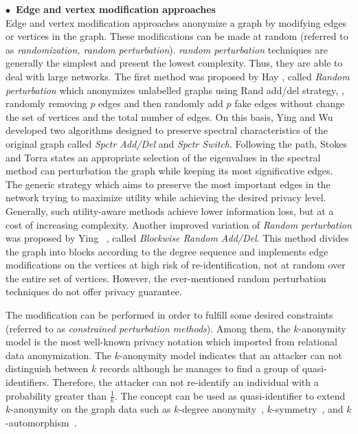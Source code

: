 \hspace{-2em}\textbf{$\bullet$~Edge and vertex modification approaches}\\
Edge and vertex modification approaches anonymize a graph by modifying edges or vertices in the graph. These modifications can be made at random (referred to as {\em randomization, random perturbation}). {\em random perturbation} techniques are generally the simplest and present the lowest complexity. Thus, they are able to deal with large networks. The first method was proposed by Hay {\etal}, called {\em Random perturbation} which anonymizes unlabelled graphs using Rand add/del strategy, {\ie}, randomly removing $p$ edges and then randomly add $p$ fake edges without change the set of vertices and the total number of edges. On this basis, Ying and Wu~\cite{Ying2009,Ying_Randomizing_2008} developed two algorithms designed to preserve spectral characteristics of the original graph called {\em Spctr Add/Del} and {\em Spctr Switch}. Following the path, Stokes and Torra states an appropriate selection of the eigenvalues in the spectral method  can perturbation the graph while keeping its most significative edges. The generic strategy which aims to preserve the most important edges in the network trying to maximize utility while achieving the desired privacy level. Generally, such utility-aware methods achieve lower information loss, but at a cost of increasing complexity. Another improved variation of {\em Random perturbation} was proposed by Ying {\etal}~\cite{Ying2009}, called {\em Blockwise Random Add/Del}. This method divides the graph into blocks according to the degree sequence and implements edge modifications on the vertices at high risk of re-identification, not at random over the entire set of vertices. However, the ever-mentioned random perturbation techniques do not offer privacy guarantee.

The modification can be performed in order to fulfill some desired constraints (referred to as {\em constrained perturbation methods}). Among them, the $k$-anonymity model is the most well-known privacy notation which imported from relational data anonymization. The $k$-anonymity model indicates that an attacker can not distinguish between $k$ records although he manages to find a group of quasi-identifiers. Therefore, the attacker can not re-identify an individual with a probability greater than $\frac{1}{k}$. The concept can be used as quasi-identifier to extend $k$-anonymity on the graph data such as $k$-degree anonymity~\cite{Liu_Towards_2008}, $k$-symmetry~\cite{Wu_k_2010}, and $k$-automorphism~\cite{Zou_K_2009}. 

